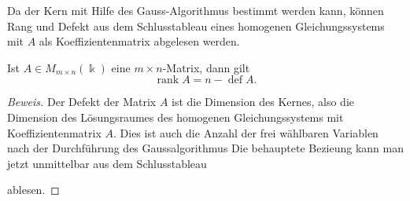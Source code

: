 Da der Kern mit Hilfe des Gauss-Algorithmus bestimmt werden kann,
können Rang und Defekt aus dem Schlusstableau
eines homogenen Gleichungssystems mit $A$ als Koeffizientenmatrix
abgelesen werden.

\begin{satz}
Ist $A\in M_{m\times n}(\Bbbk)$ eine $m\times n$-Matrix,
dann gilt
\[
\operatorname{rank}A
=
n-\operatorname{def}A.
\]
\end{satz}

\begin{proof}[Beweis]
Der Defekt der Matrix $A$ ist die Dimension des Kernes, also die
Dimension des Lösungsraumes des homogenen Gleichungssystems mit
Koeffizientenmatrix $A$.
Dies ist auch die Anzahl der frei wählbaren Variablen nach
der Durchführung des Gaussalgorithmus
Die behauptete Bezieung kann man jetzt unmittelbar aus dem
Schlusstableau
\begin{center}
\end{center}
ablesen.
\end{proof}

